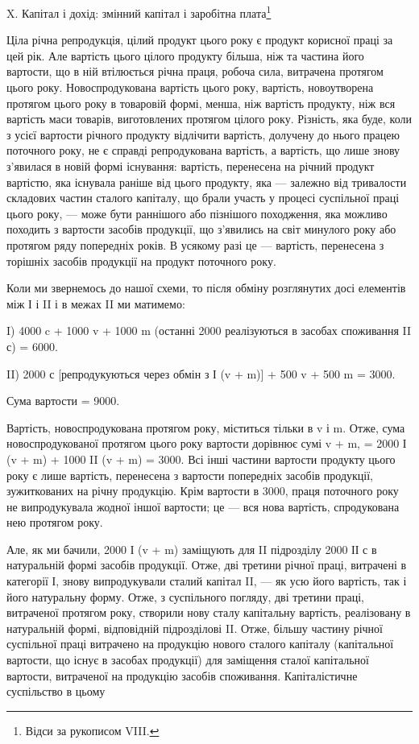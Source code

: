 X. Капітал і дохід: змінний капітал і заробітна плата\footnote{
Відси за рукописом VIII.
}

Ціла річна репродукція, цілий продукт цього року є продукт корисної
праці за цей рік. Але вартість цього цілого продукту більша, ніж
та частина його вартости, що в ній втілюється річна праця, робоча
сила, витрачена протягом цього року. Новоспродукована вартість
цього року, вартість, новоутворена протягом цього року в товаровій
формі, менша, ніж вартість продукту, ніж вся вартість маси товарів,
виготовлених протягом цілого року. Різність, яка буде, коли з усієї
вартости річного продукту відлічити вартість, долучену до нього працею
поточного року, не є справді репродукована вартість, а вартість, що лише
знову з’явилася в новій формі існування: вартість, перенесена на річний
продукт вартістю, яка існувала раніше від цього продукту, яка — залежно
від тривалости складових частин сталого капіталу, що брали участь у
процесі суспільної праці цього року, — може бути раннішого або пізнішого
походження, яка можливо походить з вартости засобів продукції,
що з’явились на світ минулого року або протягом ряду попередніх років.
В усякому разі це — вартість, перенесена з торішніх засобів продукції
на продукт поточного року.

Коли ми звернемось до нашої схеми, то після обміну розглянутих досі
елементів між І і II і в межах II ми матимемо:

I) 4000 c + 1000 v + 1000 m (останні 2000 реалізуються в засобах
споживання II с) = 6000.

II) 2000 с [репродукуються через обмін з І (v + m)] + 500 v + 500 m =
3000.

Сума вартости = 9000.

Вартість, новоспродукована протягом року, міститься тільки в v і m.
Отже, сума новоспродукованої протягом цього року вартости дорівнює
сумі v + m, = 2000 І (v + m) + 1000 II (v + m) = 3000. Всі інші частини
вартости продукту цього року є лише вартість, перенесена з вартости
попередніх засобів продукції, зужиткованих на річну продукцію.
Крім вартости в 3000, праця поточного року не випродукувала жодної
іншої вартости; це — вся нова вартість, спродукована нею протягом року.

Але, як ми бачили, 2000 І (v + m) заміщують для II підрозділу 2000
ІІ с в натуральній формі засобів продукції. Отже, дві третини річної
праці, витрачені в категорії І, знову випродукували сталий капітал II, —
як усю його вартість, так і його натуральну форму. Отже, з суспільного
погляду, дві третини праці, витраченої протягом року, створили нову сталу
капітальну вартість, реалізовану в натуральній формі, відповідній підрозділові
II. Отже, більшу частину річної суспільної праці витрачено на
продукцію нового сталого капіталу (капітальної вартости, що існує в
засобах продукції) для заміщення сталої капітальної вартости, витраченої
на продукцію засобів споживання. Капіталістичне суспільство в цьому
\parbreak{}  %
